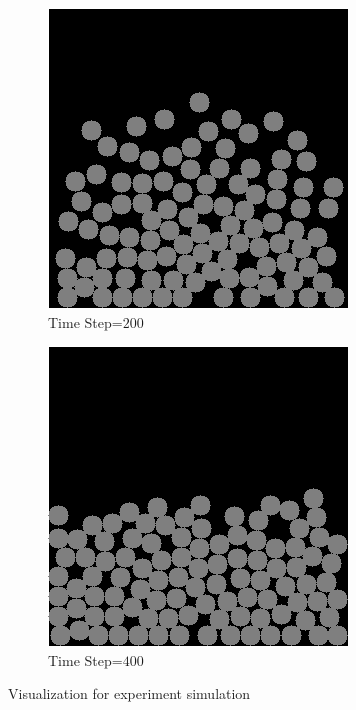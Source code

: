\begin{figure}[!h]
\begin{subfigure}[b]{0.3\textwidth}
            \includegraphics[width=\textwidth]{Figures/sim2.png}
            \caption{Time Step=$200$}
        \end{subfigure}
        \begin{subfigure}[b]{0.3\textwidth}
            \includegraphics[width=\textwidth]{Figures/sim3.png}
            \caption{Time Step=$400$}
        \end{subfigure}
        \caption{Visualization for experiment simulation}
        \label{fig:imsim}
    \end{figure}
